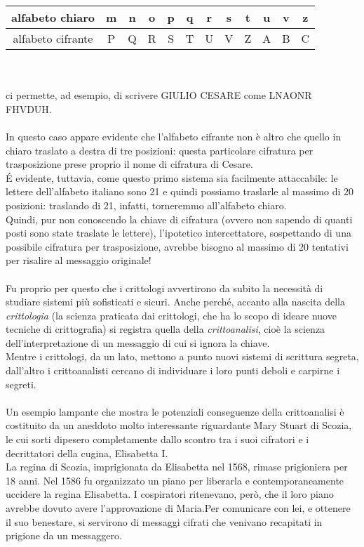 \documentclass[a4paper,12pt]{article}
\begin{document}
\begin{tabular}{ | c | c | c | c | c | c | c | c | c | c | c | c | }
\hline
alfabeto chiaro & m & n & o & p & q & r & s & t & u & v & z \\
\hline
alfabeto cifrante & P & Q & R & S & T & U & V & Z & A & B & C \\
\hline
\end{tabular}\\\\
ci permette, ad esempio, di scrivere GIULIO CESARE come LNAONR FHVDUH.\\\\
In questo caso appare evidente che l’alfabeto cifrante non è altro che quello in chiaro traslato a destra di tre posizioni: questa particolare cifratura per trasposizione prese proprio il nome di cifratura di Cesare.\\
\'E evidente, tuttavia, come questo primo sistema sia facilmente attaccabile: le lettere dell’alfabeto italiano sono 21 e quindi possiamo traslarle al massimo di 20 posizioni: traslando di 21, infatti, torneremmo all’alfabeto chiaro.\\
Quindi, pur non conoscendo la chiave di cifratura (ovvero non sapendo di quanti posti sono state traslate le lettere), l'ipotetico intercettatore, sospettando di una possibile cifratura per trasposizione, avrebbe bisogno al massimo di 20 tentativi per risalire al messaggio originale!\\\\
Fu proprio per questo che i crittologi avvertirono da subito la necessità di studiare sistemi più sofisticati e sicuri. Anche perché, accanto alla nascita della \emph{crittologia} (la scienza praticata dai crittologi, che ha lo scopo di ideare nuove tecniche di crittografia) si registra quella della \emph{crittoanalisi}, cioè la scienza
dell’interpretazione di un messaggio di cui si ignora la chiave.\\
Mentre i crittologi, da un lato, mettono a punto nuovi sistemi di scrittura segreta, dall’altro i crittoanalisti cercano di individuare i loro punti deboli e carpirne i segreti.\\\\
Un esempio lampante che mostra le potenziali conseguenze della crittoanalisi è costituito da un aneddoto molto interessante riguardante Mary Stuart di Scozia, le cui sorti dipesero completamente dallo scontro tra i suoi cifratori e i decrittatori della cugina, Elisabetta I.\\
La regina di Scozia, imprigionata da Elisabetta nel 1568, rimase prigioniera per 18 anni. Nel 1586 fu organizzato un piano per liberarla e contemporaneamente uccidere la regina Elisabetta. I cospiratori ritenevano, però, che il loro piano avrebbe dovuto avere l’approvazione di Maria.Per comunicare con lei, e ottenere il suo benestare, si servirono di messaggi cifrati che venivano recapitati in prigione da un messaggero.\\\\
\end{document}
